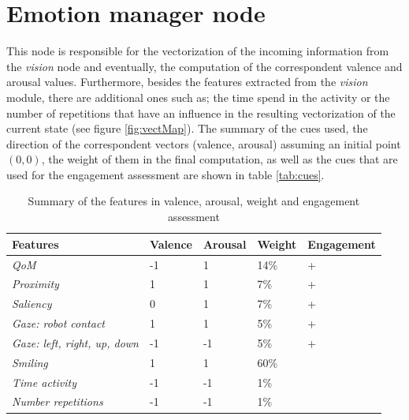 \section{Emotion manager node}
This node is responsible for the vectorization of the incoming information from the \textit{vision} node and eventually, the computation of the correspondent valence and arousal values. Furthermore, besides the features extracted from the \textit{vision} module, there are additional ones such as; the time spend in the activity or the number of repetitions that have an influence in the resulting vectorization of the current state (see figure \ref{fig:vectMap}). The summary of the cues used, the direction of the correspondent vectors (valence, arousal) assuming an initial point $ (0,0) $, the weight of them in the final computation, as well as the cues that are used for the engagement assessment are shown in table \ref{tab:cues}.

\begin{table}[h!]
\centering
\begin{tabular}{l|l|l|l|l}
 \textbf{Features}   & \textbf{Valence}  & \textbf{Arousal}  & \textbf{Weight} & \textbf{Engagement}\\ \hline	
 \textit{QoM}  	  		  	 &   -1 	      	 &    1 	& 14\% &   +  \\ \hline
 \textit{Proximity}    	  	 &   1  	      	 &    1		& 7\%  &   +  \\ \hline
 \textit{Saliency}	  	  	 &   0 	      		 &    1 	& 7\%  &   +  \\ \hline
 \textit{Gaze: robot contact} 	 &   1	      	 &    1 	& 5\%  &   +  \\ \hline
 \textit{Gaze: left, right, up, down} & -1	     &   -1     & 5\%  &   +  \\ \hline
 \textit{Smiling}	  	  	 &   1 	      		 &    1 	& 60\% &      \\ \hline
 \textit{Time activity}	  	 &   -1	      		 &   -1 	& 1\%  &      \\ \hline
 \textit{Number repetitions} &   -1 	         &   -1	    & 1\%  &       	

\end{tabular}
\caption{Summary of the features in valence, arousal, weight and engagement assessment}
\end{table}\label{tab:cues}

